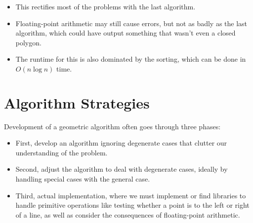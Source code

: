 \documentclass{article}
\theoremstyle{definition}
\theoremstyle{plain}
\begin{document}
\begin{itemize}
    \item This rectifies most of the problems with the last algorithm.
    \item Floating-point arithmetic may still cause errors, but not as badly as the last algorithm, which
    could have output something that wasn't even a closed polygon.
    \item The runtime for this is also dominated by the sorting, which can be done in $O(n\log n)$ time.
\end{itemize}

\section{Algorithm Strategies}
Development of a geometric algorithm often goes through three phases:
\begin{itemize}
    \item First, develop an algorithm ignoring degenerate cases that clutter our understanding of the problem.
    \item Second, adjust the algorithm to deal with degenerate cases, ideally by handling special cases with the general case.
    \item Third, actual implementation, where we must implement or find libraries to handle primitive operations like testing
    whether a point is to the left or right of a line, as well as consider the consequences of floating-point arithmetic.
\end{itemize}
\end{document}
